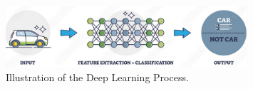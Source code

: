 \begin{figure}[H]
  \centering
  \includegraphics[width=0.8\textwidth]{Images/Chapter1/dl.png}
  \caption{Illustration of the Deep Learning Process. \cite{alltius2025deeplearning}}
  \label{fig:dl}
\end{figure}





